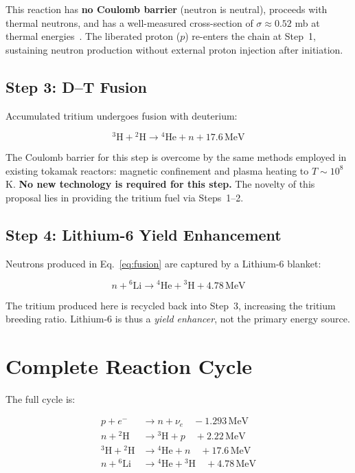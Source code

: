 \documentclass[12pt,a4paper]{article}
\begin{document}
This reaction has \textbf{no Coulomb barrier} (neutron is neutral),
proceeds with thermal neutrons, and has a well-measured cross-section
of $\sigma \approx 0.52$ mb at thermal energies~\cite{pdg2022}.
The liberated proton ($p$) re-enters the chain at Step~1,
sustaining neutron production without external proton injection
after initiation.

\subsection{Step 3: D--T Fusion}

Accumulated tritium undergoes fusion with deuterium:

\begin{equation}
  {}^3\text{H} + {}^2\text{H} \rightarrow {}^4\text{He} + n
  + 17.6\,\text{MeV}
  \label{eq:fusion}
\end{equation}

The Coulomb barrier for this step is overcome by the same methods
employed in existing tokamak reactors: magnetic confinement and
plasma heating to $T \sim 10^8$ K. \textbf{No new technology is
required for this step.} The novelty of this proposal lies in
providing the tritium fuel via Steps~1--2.

\subsection{Step 4: Lithium-6 Yield Enhancement}

Neutrons produced in Eq.~\eqref{eq:fusion} are captured by a
Lithium-6 blanket:

\begin{equation}
  n + {}^6\text{Li} \rightarrow {}^4\text{He} + {}^3\text{H}
  + 4.78\,\text{MeV}
  \label{eq:li6}
\end{equation}

The tritium produced here is recycled back into Step~3, increasing
the tritium breeding ratio. Lithium-6 is thus a \emph{yield
enhancer}, not the primary energy source.

\section{Complete Reaction Cycle}

The full cycle is:

\begin{align}
  p + e^- &\rightarrow n + \nu_e
  \quad -1.293\,\text{MeV} \tag{S1}\\
  n + {}^2\text{H} &\rightarrow {}^3\text{H} + p
  \quad +2.22\,\text{MeV} \tag{S2}\\
  {}^3\text{H} + {}^2\text{H} &\rightarrow {}^4\text{He} + n
  \quad +17.6\,\text{MeV} \tag{S3}\\
  n + {}^6\text{Li} &\rightarrow {}^4\text{He} + {}^3\text{H}
  \quad +4.78\,\text{MeV} \tag{S4}
\end{align}
\end{document}
